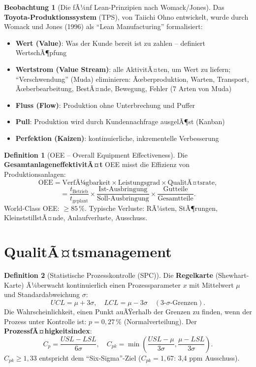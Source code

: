 ﻿\documentclass[a4paper,12pt]{report}
\theoremstyle{definition}
\newtheorem{definition}{Definition}
\newtheorem{beobachtung}{Beobachtung}
\begin{document}
\begin{beobachtung}[Die fÃ¼nf Lean-Prinzipien nach Womack/Jones]
Das \textbf{Toyota-Produktionssystem} (TPS), von Taiichi Ohno entwickelt,
wurde durch Womack und Jones (1996) als ``Lean Manufacturing'' formalisiert:
\begin{itemize}
    \item[-] \textbf{Wert (Value)}: Was der Kunde bereit ist zu zahlen -- definiert WertschÃ¶pfung
    \item[-] \textbf{Wertstrom (Value Stream)}: alle AktivitÃ¤ten, um Wert zu liefern;
          ``Verschwendung'' (Muda) eliminieren: Ãœberproduktion, Warten, Transport,
          Ãœberbearbeitung, BestÃ¤nde, Bewegung, Fehler (7 Arten von Muda)
    \item[-] \textbf{Fluss (Flow)}: Produktion ohne Unterbrechung und Puffer
    \item[-] \textbf{Pull}: Produktion wird durch Kundennachfrage ausgelÃ¶st (Kanban)
    \item[-] \textbf{Perfektion (Kaizen)}: kontinuierliche, inkrementelle Verbesserung
\end{itemize}
\end{beobachtung}

\begin{definition}[OEE -- Overall Equipment Effectiveness]
Die \textbf{GesamtanlageneffektivitÃ¤t} OEE misst die Effizienz von Produktionsanlagen:
\[
  \text{OEE} = \text{VerfÃ¼gbarkeit} \times \text{Leistungsgrad} \times \text{QualitÃ¤tsrate},
\]
\[
  = \frac{t_{\text{Betrieb}}}{t_{\text{geplant}}} \times \frac{\text{Ist-Ausbringung}}{\text{Soll-Ausbringung}} \times \frac{\text{Gutteile}}{\text{Gesamtteile}}.
\]
World-Class OEE: $\ge 85\,\%$. Typische Verluste: RÃ¼sten, StÃ¶rungen,
KleinststillstÃ¤nde, Anlaufverluste, Ausschuss.
\end{definition}

\section{QualitÃ¤tsmanagement}

\begin{definition}[Statistische Prozesskontrolle (SPC)]
Die \textbf{Regelkarte} (Shewhart-Karte) Ã¼berwacht kontinuierlich
einen Prozessparameter $x$ mit Mittelwert $\mu$ und Standardabweichung $\sigma$:
\[
  UCL = \mu + 3\sigma, \quad LCL = \mu - 3\sigma \quad (\text{3-$\sigma$-Grenzen}).
\]
Die Wahrscheinlichkeit, einen Punkt auÃŸerhalb der Grenzen zu finden,
wenn der Prozess unter Kontrolle ist: $p = 0{,}27\,\%$ (Normalverteilung).
Der \textbf{ProzessfÃ¤higkeitsindex}:
\[
  C_p = \frac{USL - LSL}{6\sigma}, \quad C_{pk} = \min\left(\frac{USL-\mu}{3\sigma}, \frac{\mu-LSL}{3\sigma}\right).
\]
$C_{pk} \ge 1{,}33$ entspricht dem ``Six-Sigma''-Ziel ($C_{pk} = 1{,}67$: 3{,}4 ppm Ausschuss).
\end{definition}
\end{document}
